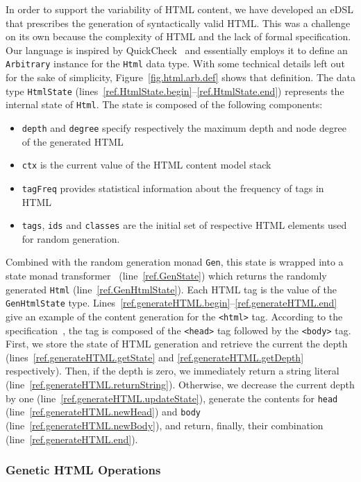 \documentclass[sigconf,review]{acmart}
\begin{document}
In order to support the variability of HTML content, we have developed an eDSL that prescribes the generation of syntactically valid HTML. This was a challenge on its own because the complexity of HTML and the lack of formal specification. Our language is inspired by QuickCheck~\cite{claessen2011quickcheck} and essentially employs it to define an \texttt{Arbitrary} instance for the \texttt{Html} data type. With some technical details left out for the sake of simplicity, Figure~\ref{fig.html.arb.def} shows that definition. The data type \texttt{HtmlState} (lines~\ref{ref.HtmlState.begin}--\ref{ref.HtmlState.end}) represents the internal state of \texttt{Html}. The state is composed of the following components:
\begin{itemize}
\item \texttt{depth} and \texttt{degree} specify respectively the maximum depth and node degree of the generated HTML 
\item \texttt{ctx} is the current value of the HTML content model stack 
\item \texttt{tagFreq} provides statistical information about the frequency of tags in HTML
\item \texttt{tags}, \texttt{ids} and \texttt{classes} are the initial set of respective HTML elements used for random generation.
\end{itemize}
Combined with the random generation monad \texttt{Gen}, this state is wrapped into a state monad transformer~\cite{jones1995functional} (line~\ref{ref.GenState}) which returns the randomly generated \texttt{Html} (line~\ref{ref.GenHtmlState}). Each HTML tag is the value of the \texttt{GenHtmlState} type. Lines~\ref{ref.generateHTML.begin}--\ref{ref.generateHTML.end} give an example of the content generation for the \texttt{<html>} tag. According to the specification~\cite{htmlspec}, the tag is composed of the \texttt{<head>} tag followed by the \texttt{<body>} tag. First, we store the state of HTML generation and retrieve the current the depth (lines~\ref{ref.generateHTML.getState} and \ref{ref.generateHTML.getDepth} respectively). Then, if the depth is zero, we immediately return a string literal (line~\ref{ref.generateHTML.returnString}). Otherwise, we decrease the current depth by one (line~\ref{ref.generateHTML.updateState}), generate the contents for \texttt{head} (line~\ref{ref.generateHTML.newHead}) and \texttt{body} (line~\ref{ref.generateHTML.newBody}), and return, finally, their combination (line~\ref{ref.generateHTML.end}).

\subsubsection{Genetic HTML Operations}
\label{sub.sub.sec.genetic.oper}
\end{document}
